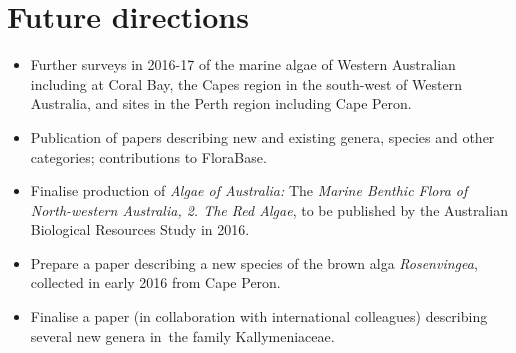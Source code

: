 \documentclass[version=last,
    paper=a4, %
    10pt, %
    usenames,
    dvipsnames,
    oneside, %
    headings=openany, %
    DIV=15 %
]{scrbook}
\begin{document}
\section*{Future directions}
\begin{itemize}
\itemsep1pt\parskip0pt
\item
  Further surveys in 2016-17 of the marine algae of Western Australian
  including at Coral Bay, the Capes region in the south-west of Western
  Australia, and sites in the Perth region including Cape Peron.
\item
  Publication of papers describing new and existing genera, species and
  other categories; contributions to FloraBase.~
\item
  Finalise production of \emph{Algae of Australia:} The \emph{Marine
  Benthic Flora of North-western Australia, 2. The Red Algae}, to be
  published by the Australian Biological Resources Study in 2016.
\item
  Prepare a paper describing a new species of the brown alga
  \emph{Rosenvingea}, collected in early 2016 from Cape Peron.~
\item
  Finalise a paper (in collaboration with international colleagues)
  describing several new genera in~the family Kallymeniaceae.~
\end{itemize}



\end{document}
